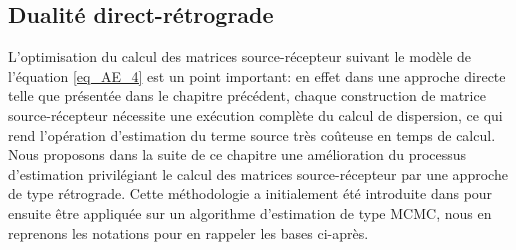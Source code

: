 \subsection{Dualité {direct-rétrograde}}

L'optimisation du calcul des matrices source-récepteur suivant le modèle de l'équation \eqref{eq_AE_4} est un point important: en effet dans une approche directe telle que présentée dans le chapitre précédent, {chaque construction de matrice source-récepteur nécessite une exécution complète du calcul de dispersion}, ce qui rend l'opération d'estimation du terme source très coûteuse en temps de calcul.\\

Nous proposons dans la suite de ce chapitre une amélioration du processus d'estimation privilégiant le calcul des matrices source-récepteur par une approche de type {rétrograde}. Cette méthodologie a initialement été introduite dans \cite{Keats2007} pour ensuite être appliquée sur un algorithme d'estimation de type MCMC, {nous en reprenons les notations pour en rappeler les bases ci-après.}\\

